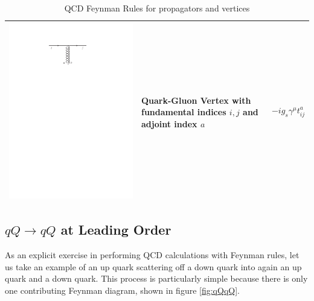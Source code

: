 \begin{table}[h!]
\begin{tabular}{ | c | m{5cm} | m{5cm} | }
\begin{minipage}{.3\textwidth}
      \includegraphics[scale=0.7]{Images/qg_vert.pdf}
    \end{minipage}
    \hspace{2pt}
    &
    Quark-Gluon Vertex with fundamental indices $i,j$ and adjoint index $a$
    & 
    \begin{minipage}{5cm}
    \centering
     $$  -i g_s \gamma^\mu t^a_{ij}$$
    \end{minipage}
    \\ [\VSpace]

    \hline
  \end{tabular}
  \caption{QCD Feynman Rules for propagators and vertices}\label{tab:QCD}
\end{table}

\subsection{$qQ \to qQ$ at Leading Order}
As an explicit exercise in performing QCD calculations with Feynman rules, let us take an example of an up quark scattering off a down quark into again an up quark and a down quark. This process is particularly simple because there is only one contributing Feynman diagram, shown in figure \ref{fig:qQqQ}.

